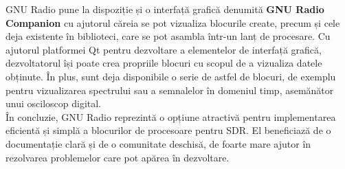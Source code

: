 GNU Radio pune la dispoziție și o interfață grafică denumită \textbf{GNU Radio
Companion} cu ajutorul căreia se pot vizualiza blocurile create, precum și cele
deja existente în biblioteci, care se pot asambla într-un lanț de procesare. Cu
ajutorul platformei Qt pentru dezvoltare a elementelor de interfață
grafică, dezvoltatorul își poate crea propriile blocuri cu scopul de a vizualiza
datele obținute. În plus, sunt deja disponibile o serie de astfel de
blocuri, de exemplu pentru vizualizarea spectrului sau a semnalelor în domeniul timp,
asemănător unui osciloscop digital. \\

În concluzie, GNU Radio reprezintă o opțiune atractivă pentru implementarea
eficientă și simplă a blocurilor de procesoare pentru SDR. El beneficiază de o
documentație clară și de o comunitate deschisă, de foarte mare ajutor în
rezolvarea problemelor care pot apărea în dezvoltare.

